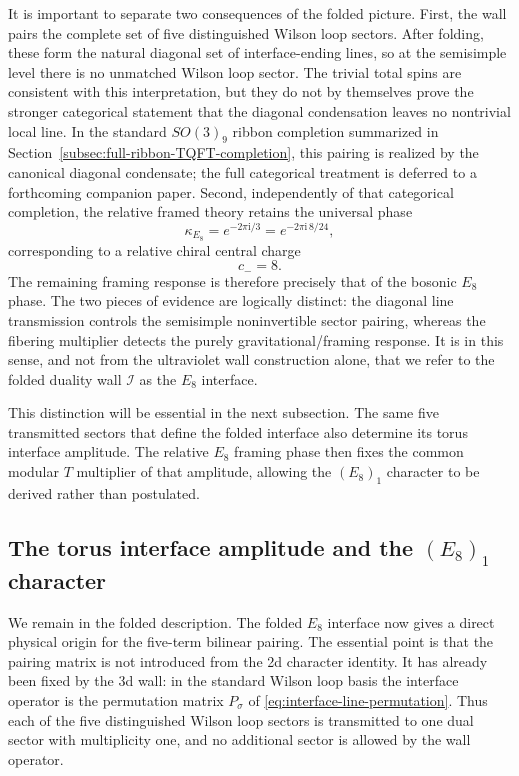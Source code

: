 \documentclass[11pt,a4paper]{article}
\numberwithin{equation}{section}
\begin{document}
It is important to separate two consequences of the folded picture.  First, the wall pairs the complete set of five distinguished Wilson loop sectors.  After folding, these form the natural diagonal set of interface-ending lines, so at the semisimple level there is no unmatched Wilson loop sector.  The trivial total spins are consistent with this interpretation, but they do not by themselves prove the stronger categorical statement that the diagonal condensation leaves no nontrivial local line.  In the standard $SO(3)_9$ ribbon completion summarized in Section~\ref{subsec:full-ribbon-TQFT-completion}, this pairing is realized by the canonical diagonal condensate; the full categorical treatment is deferred to a forthcoming companion paper.  Second, independently of that categorical completion, the relative framed theory retains the universal phase
\begin{equation}
  \kappa_{E_8}
  =e^{-2\pi \mathrm{i}/3}
  =e^{-2\pi \mathrm{i}\,8/24},
  \label{eq:folded-E8-framing-phase}
\end{equation}
corresponding to a relative chiral central charge
\begin{equation}
  c_-=8.
  \label{eq:folded-E8-chiral-central-charge}
\end{equation}
The remaining framing response is therefore precisely that of the bosonic $E_8$ phase.  The two pieces of evidence are logically distinct: the diagonal line transmission controls the semisimple noninvertible sector pairing, whereas the fibering multiplier detects the purely gravitational/framing response.  It is in this sense, and not from the ultraviolet wall construction alone, that we refer to the folded duality wall $\mathcal I$ as the $E_8$ interface.

This distinction will be essential in the next subsection.  The same five transmitted sectors that define the folded interface also determine its torus interface amplitude.  The relative $E_8$ framing phase then fixes the common modular $T$ multiplier of that amplitude, allowing the $(E_8)_1$ character to be derived rather than postulated.


\subsection{The torus interface amplitude and the $(E_8)_1$ character}
\label{subsec:interface-E8-bilinear}

We remain in the folded description.  The folded $E_8$ interface now gives a direct physical origin for the five-term bilinear pairing.  The essential point is that the pairing matrix is not introduced from the 2d character identity.  It has already been fixed by the 3d wall: in the standard Wilson loop basis the interface operator is the permutation matrix $P_\sigma$ of \eqref{eq:interface-line-permutation}.  Thus each of the five distinguished Wilson loop sectors is transmitted to one dual sector with multiplicity one, and no additional sector is allowed by the wall operator.
\end{document}
